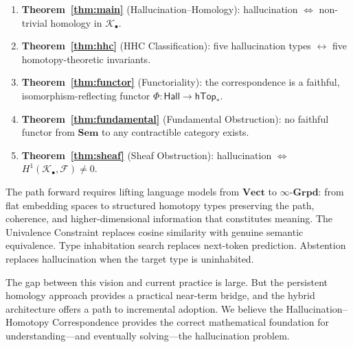 \documentclass[11pt,a4paper]{article}
\theoremstyle{plain}
\theoremstyle{definition}
\newcommand{\Sem}{\mathbf{Sem}}
\newcommand{\Vect}{\mathbf{Vect}}
\newcommand{\Grpd}{\boldsymbol{\infty}\text{-}\mathbf{Grpd}}
\begin{document}
\begin{enumerate}[leftmargin=*,nosep]
  \item \textbf{Theorem~\ref{thm:main}} (Hallucination--Homology): hallucination $\iff$ non-trivial homology in $\mathcal{K}_\bullet$.
  \item \textbf{Theorem~\ref{thm:hhc}} (HHC Classification): five hallucination types $\leftrightarrow$ five homotopy-theoretic invariants.
  \item \textbf{Theorem~\ref{thm:functor}} (Functoriality): the correspondence is a faithful, isomorphism-reflecting functor $\Phi\colon \mathsf{Hall} \to \mathsf{hTop}_*$.
  \item \textbf{Theorem~\ref{thm:fundamental}} (Fundamental Obstruction): no faithful functor from $\Sem$ to any contractible category exists.
  \item \textbf{Theorem~\ref{thm:sheaf}} (Sheaf Obstruction): hallucination $\iff$ $H^1(\mathcal{K}_\bullet, \mathcal{F}) \neq 0$.
\end{enumerate}

The path forward requires lifting language models from $\Vect$ to $\Grpd$: from flat embedding spaces to structured homotopy types preserving the path, coherence, and higher-dimensional information that constitutes meaning. The Univalence Constraint replaces cosine similarity with genuine semantic equivalence. Type inhabitation search replaces next-token prediction. Abstention replaces hallucination when the target type is uninhabited.

The gap between this vision and current practice is large. But the persistent homology approach provides a practical near-term bridge, and the hybrid architecture offers a path to incremental adoption. We believe the Hallucination--Homotopy Correspondence provides the correct mathematical foundation for understanding---and eventually solving---the hallucination problem.
\end{document}
